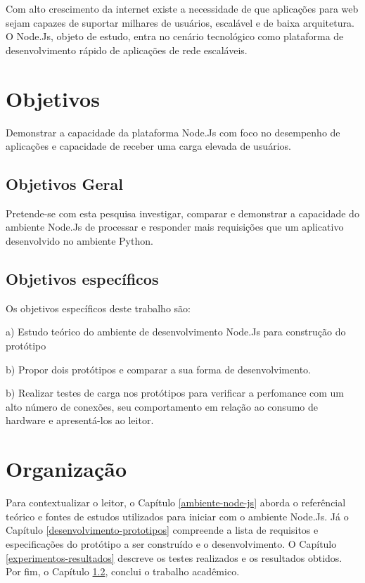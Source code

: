   Com alto crescimento da internet existe a necessidade de que aplicações para web sejam capazes de suportar milhares de usuários,
  escalável e de baixa arquitetura. O Node.Js, objeto de estudo, entra no cenário tecnológico como plataforma de desenvolvimento rápido
  de aplicações de rede escaláveis.
  
\section{Objetivos}
\label{objetivos}

  Demonstrar a capacidade da plataforma Node.Js com foco no desempenho de aplicações e capacidade de receber uma carga
  elevada de usuários.

\subsection{Objetivos Geral}

  Pretende-se com esta pesquisa investigar, comparar e demonstrar a capacidade 
  do ambiente Node.Js de processar e responder mais requisições que um aplicativo desenvolvido no ambiente Python.
 
  
\subsection{Objetivos específicos}

  Os objetivos específicos deste trabalho são:
  
    \begin{compactitem}
      \item[a)] Estudo teórico do ambiente de desenvolvimento Node.Js para construção do protótipo 
      \item[b)] Propor dois protótipos e comparar a sua forma de desenvolvimento.
      \item[b)] Realizar testes de carga nos protótipos para verificar a perfomance com um alto número de conexões,
      seu comportamento em relação ao consumo de hardware e apresentá-los ao leitor.
    \end{compactitem}
  
  
\section{Organização}
\label{organizacao}  

  Para contextualizar o leitor, o Capítulo \ref{ambiente-node-js} aborda o referêncial teórico e fontes de estudos utilizados para iniciar com o ambiente 
  Node.Js. Já o Capítulo \ref{desenvolvimento-prototipos} compreende a lista de requisitos e especificações do protótipo a ser construído e o
  desenvolvimento. O Capítulo \ref{experimentos-resultados} descreve os testes realizados e os resultados obtidos. 
  Por fim, o Capítulo \ref{}, conclui o trabalho acadêmico.